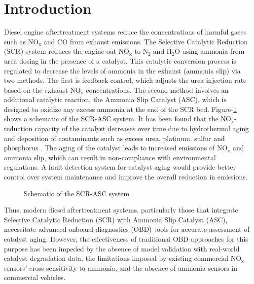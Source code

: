 \documentclass[subscriptcorrection,upint,varvw,barcolor=Goldenrod3,mathalfa=cal=euler,balance,hyphenate,french,pdf-a]{asmejour}
\def\versionno{0.2} %
\newcommand{\nox}{\text{NO}_{\text{x}}}
\newcommand{\water}{\text{H}_{2}\text{O}}
\newcommand{\nitrogen}{\text{N}_{2}}
\begin{document}
\date{Version \versionno , \today}
\maketitle

\section{ Introduction }
Diesel engine aftertreatment systems reduce the concentrations of harmful gases such as $\nox$ and $\text{CO}$ from
exhaust emissions. The Selective Catalytic Reduction (SCR) system reduces the engine-out $\nox$ to $\nitrogen$ and
$\water$ using ammonia from urea dosing in the presence of a catalyst. This catalytic conversion process is regulated to
decrease the levels of ammonia in the exhaust (ammonia slip) via two methods. The first is feedback control, which
adjusts the urea injection rate based on the exhaust $\nox$ concentrations. The second method involves an additional
catalytic reaction, the Ammonia Slip Catalyst (ASC), which is designed to oxidize any excess ammonia at the end of the
SCR bed. Figure-\ref{fig:exhaust_scheme} shows a schematic of the SCR-ASC system. It has been found that the
$\nox$-reduction capacity of the catalyst decreases over time due to hydrothermal aging and deposition of contaminants
such as excess urea, platinum, sulfur and phosphorus \cite{matsumoto2016model}. The aging of the catalyst leads to
increased emissions of $\nox$ and ammonia slip, which can result in non-compliance with environmental regulations. A
fault detection system for catalyst aging would provide better control over system maintenance and improve the overall
reduction in emissions.

\begin{figure}[ht]
    \centering
    \caption{Schematic of the SCR-ASC system}
    \label{fig:exhaust_scheme}
\end{figure}

Thus, modern diesel aftertreatment systems, particularly those that integrate Selective Catalytic Reduction (SCR) with
Ammonia Slip Catalyst (ASC), necessitate advanced onboard diagnostics (OBD) tools for accurate assessment of catalyst
aging. However, the effectiveness of traditional OBD approaches for this purpose has been impeded by the absence of
model validation with real-world catalyst degradation data, the limitations imposed by existing commercial $\nox$
sensors' cross-sensitivity to ammonia, and the absence of ammonia sensors in commercial vehicles.
\end{document}
